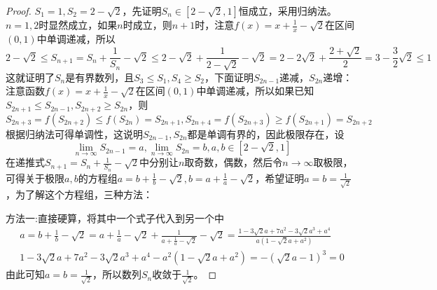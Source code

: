 \documentclass[../../main.tex]{subfiles}
\begin{document}
\begin{proof}
\(S_1 = 1,S_2 = 2-\sqrt{2}\)，先证明\(S_n\in[2 - \sqrt{2},1]\)恒成立，采用归纳法。
\(n = 1,2\)时显然成立，如果\(n\)时成立，则\(n + 1\)时，注意\(f(x)=x+\frac{1}{x}-\sqrt{2}\)在区间\((0,1)\)中单调递减，所以
\[2-\sqrt{2}\leqslant  S_{n + 1}=S_n+\frac{1}{S_n}-\sqrt{2}\leqslant 2-\sqrt{2}+\frac{1}{2 - \sqrt{2}}-\sqrt{2}=2-2\sqrt{2}+\frac{2+\sqrt{2}}{2}=3-\frac{3}{2}\sqrt{2}\leqslant 1\]
这就证明了\(S_n\)是有界数列，且\(S_3\leqslant  S_1,S_4\geqslant  S_2\)，下面证明\(S_{2n - 1}\)递减，\(S_{2n}\)递增：
注意函数\(f(x)=x+\frac{1}{x}-\sqrt{2}\)在区间\((0,1)\)中单调递减，所以如果已知\(S_{2n + 1}\leqslant  S_{2n - 1},S_{2n + 2}\geqslant  S_{2n}\)，则
\[S_{2n + 3}=f(S_{2n + 2})\leqslant  f(S_{2n})=S_{2n + 1},S_{2n + 4}=f(S_{2n + 3})\geqslant  f(S_{2n + 1})=S_{2n + 2}\]
根据归纳法可得单调性，这说明\(S_{2n - 1},S_{2n}\)都是单调有界的，因此极限存在，设
\[\lim_{n\rightarrow\infty}S_{2n - 1}=a,\lim_{n\rightarrow\infty}S_{2n}=b,a,b\in[2 - \sqrt{2},1]\]
在递推式\(S_{n + 1}=S_n+\frac{1}{S_n}-\sqrt{2}\)中分别让\(n\)取奇数，偶数，然后令\(n\rightarrow\infty\)取极限，可得关于极限\(a,b\)的方程组\(a = b+\frac{1}{b}-\sqrt{2},b = a+\frac{1}{a}-\sqrt{2}\)，希望证明\(a = b=\frac{1}{\sqrt{2}}\)，为了解这个方程组，三种方法：

{\color{blue}方法一:}直接硬算，将其中一个式子代入到另一个中
\begin{align*}
a=b+\frac{1}{b}-\sqrt{2}=a+\frac{1}{a}-\sqrt{2}+\frac{1}{a+\frac{1}{a}-\sqrt{2}}-\sqrt{2}=\frac{1 - 3\sqrt{2}a + 7a^2-3\sqrt{2}a^3 + a^4}{a(1-\sqrt{2}a + a^2)}\\
1 - 3\sqrt{2}a + 7a^2-3\sqrt{2}a^3 + a^4-a^2(1-\sqrt{2}a + a^2)=-\left(\sqrt{2}a - 1\right)^3=0
\end{align*}
由此可知\(a = b=\frac{1}{\sqrt{2}}\)，所以数列\(S_n\)收敛于\(\frac{1}{\sqrt{2}}\)。


\end{proof}
\end{document}
